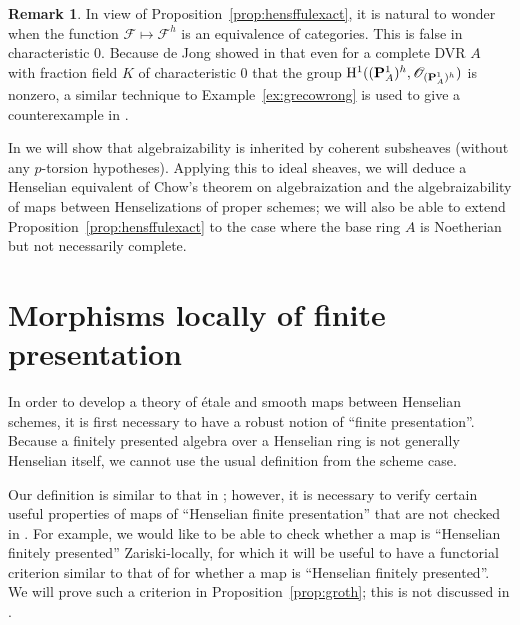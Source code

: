 \documentclass[12pt]{article}
\renewcommand{\O}{\mathscr{O}}
\renewcommand{\P}{\mathbf{P}}
\newcommand{\F}{\mathcal{F}}
\newcommand{\Et}{\'etale\xspace}
\renewcommand{\H}{{\rm H}}
\theoremstyle{definition}
\newtheorem{remark}[theorem]{Remark}
\numberwithin{equation}{subsection}
\begin{document}
\begin{remark}\label{rmk:hensffulexactext}
In view of Proposition~\ref{prop:hensffulexact}, it is natural to wonder when the function $\F \mapsto \F^h$ is an equivalence of categories. This is false in characteristic $0$. Because de Jong showed in \cite{cohpropblog} that even for a complete DVR $A$ with fraction field $K$ of characteristic $0$ that the group $\H^1((\P_A^1)^h,\O_{(\P_A^1)^h})$ is nonzero, a similar technique to Example~\ref{ex:grecowrong} is used to give a counterexample in \cite{ghga}. 

In \cite{ghga} we will show that algebraizability is inherited by coherent subsheaves (without any $p$-torsion hypotheses). Applying this to ideal sheaves, we will deduce a Henselian equivalent of Chow's theorem on algebraization and the algebraizability of maps between Henselizations of proper schemes; we will also be able to extend Proposition~\ref{prop:hensffulexact} to the case where the base ring $A$ is Noetherian but not necessarily complete.
\end{remark}















\section{Morphisms locally of finite presentation}\label{sec:lfp}



In order to develop a theory of  \Et and smooth maps between Henselian schemes, it is first necessary to have a robust notion of ``finite presentation''.  Because a finitely presented algebra over a Henselian ring is not generally Henselian itself, we cannot use the usual definition from the scheme case.

Our definition is similar to that in \cite{cox1}; however, it is necessary to verify certain useful properties of maps of ``Henselian finite presentation'' that are not checked in \cite{cox1}. For example, we would like to be able to check whether a map is ``Henselian finitely presented'' Zariski-locally, for which it will be useful to have a functorial criterion similar to that of \cite[Corollary 8.14.2.2]{ega43} for whether a map is ``Henselian finitely presented''. We will prove such a criterion in Proposition~\ref{prop:groth}; this is not discussed in \cite{cox1}.
\end{document}
